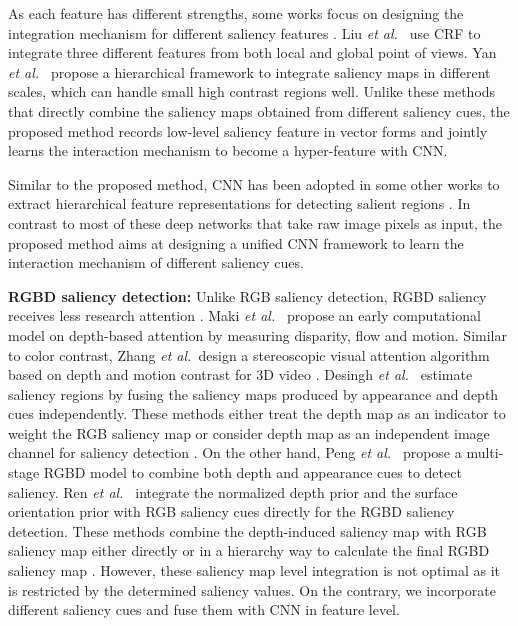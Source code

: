 \documentclass[journal]{IEEEtran}
\newcommand{\etal}{\textit{et al.~}}
\begin{document}
As each feature has different strengths, some works focus on designing the integration mechanism for different saliency features \cite{liu2011learning,shen2012unified,yan2013hierarchical,jiang2013salient}. Liu \etal \cite{liu2011learning} use CRF to integrate three different features from both local and global point of views. Yan \etal \cite{yan2013hierarchical} propose a hierarchical framework to integrate saliency maps in different scales, which can handle small high contrast regions well. Unlike these methods that directly combine the saliency maps obtained from different saliency cues, the proposed method records low-level saliency feature in vector forms and jointly learns the interaction mechanism to become a hyper-feature with CNN.

Similar to the proposed method, CNN has been adopted in some other works to extract hierarchical feature representations for detecting salient regions \cite{vig2014large,zhao2015saliency,li2015visual,he2015supercnn,wang2015deep,LiYu16}. In contrast to most of these deep networks that take raw image pixels as input, the proposed method aims at designing a unified CNN framework to learn the interaction mechanism of different saliency cues.

\textbf{RGBD saliency detection:} Unlike RGB saliency detection, RGBD saliency receives less research attention \cite{maki1996computational,zhang2010stereoscopic,desingh2013depth,lang2012depth,wang2013computational}. Maki \etal \cite{maki1996computational} propose an early computational model on depth-based attention by measuring disparity, flow and motion. Similar to color contrast, Zhang \etal design a stereoscopic visual attention algorithm based on depth and motion contrast for 3D video \cite{zhang2010stereoscopic}. Desingh \etal \cite{desingh2013depth} estimate saliency regions by fusing the saliency maps produced by appearance and depth cues independently. These methods either treat the depth map as an indicator to weight the RGB saliency map \cite{maki1996computational,zhang2010stereoscopic} or consider depth map as an independent
image channel for saliency detection \cite{lang2012depth,desingh2013depth}. On the other hand, Peng \etal \cite{peng2014rgbd} propose a multi-stage RGBD model to combine both depth and appearance cues to detect saliency. Ren \etal \cite{ren2015exploiting} integrate the normalized depth prior and the surface orientation prior with RGB saliency cues directly for the RGBD saliency detection. These methods combine the depth-induced saliency map with RGB saliency map either directly  \cite{ju2014depth,ren2015exploiting} or in a hierarchy way to calculate the final RGBD saliency map \cite{peng2014rgbd}. However, these saliency map level integration is not optimal as it is restricted by the determined saliency values. On the contrary, we incorporate different saliency cues and fuse them with CNN in feature level.
\end{document}
